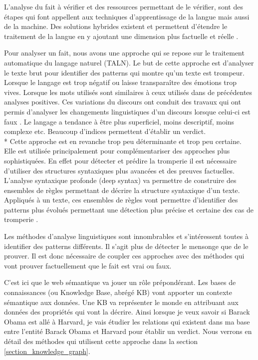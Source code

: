L'analyse du fait à vérifier et des ressources permettant de le vérifier, sont des étapes qui font appellent aux techniques d'apprentissage de la langue mais aussi de la machine. Des solutions hybrides existent et permettent d'étendre le traitement de la langue en y ajoutant une dimension plus factuelle et réelle \cite{conroy2015automatic}.

Pour analyser un fait, nous avons une approche qui se repose sur le traitement automatique du langage naturel (TALN). Le but de cette approche est d'analyser le texte brut pour identifier des patterns qui montre qu'un texte est trompeur. Lorsque le langage est trop négatif ou laisse transparaître des émotions trop vives. Lorsque les mots utilisés sont similaires à ceux utilisés dans de précédentes analyses positives. Ces variations du discours ont conduit des travaux qui ont permis d'analyser les changements linguistiques d'un discours lorsque celui-ci est faux \cite{markowitz2014linguistic}. Le langage a tendance à être plus superficiel, moins descriptif, moins complexe etc. Beaucoup d'indices permettent d'établir un verdict. 
\\*
Cette approche est en revanche trop peu déterminante et trop peu certaine. Elle est utilisée principalement pour complémentariser des approches plus sophistiquées. En effet pour détecter et prédire la tromperie il est nécessaire d'utiliser des structures syntaxiques plus avancées et des preuves factuelles. L'analyse syntaxique profonde (deep syntax) va permettre de construire des ensembles de règles permettant de décrire la structure syntaxique d'un texte. Appliqués à un texte, ces ensembles de règles vont permettre d'identifier des patterns plus évolués permettant une détection plus précise et certaine des cas de tromperie \cite{feng2012syntactic} \cite{collinsprobabilistic}.

Les méthodes d'analyse linguistiques sont innombrables et s'intéressent toutes à identifier des patterns différents. Il s'agit plus de détecter le mensonge que de le prouver. Il est donc nécessaire de coupler ces approches avec des méthodes qui vont prouver factuellement que le fait est vrai ou faux.

C'est ici que le web sémantique va jouer un rôle prépondérant. Les bases de connaissances (ou Knowledge Base, abrégé KB) vont apporter un contexte sémantique aux données. Une KB va représenter le monde en attribuant aux données des propriétés qui vont la décrire. Ainsi lorsque je veux savoir si Barack Obama est allé à Harvard, je vais étudier les relations qui existent dans ma base entre l'entité Barack Obama et Harvard pour établir un verdict. Nous verrons en détail des méthodes qui utilisent cette approche dans la section \ref{section_knowledge_graph}.

